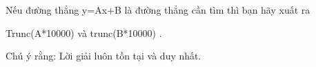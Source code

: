 Nếu đường thẳng y=Ax+B là đường thẳng cần tìm thì bạn hãy xuất ra  

   Trunc(A*10000) và trunc(B*10000) .  

       Chú ý rằng: Lời giải luôn tồn tại và duy nhất.